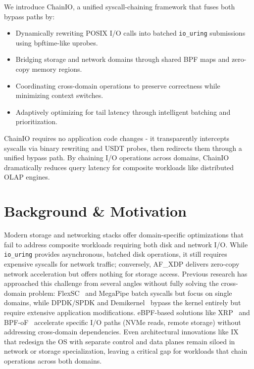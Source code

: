 \documentclass[sigconf,10pt]{acmart}
\newcommand{\sys}{ChainIO\xspace}
\begin{document}
We introduce \sys, a unified syscall-chaining framework that fuses both bypass paths by:
\begin{itemize}[leftmargin=*,itemsep=0pt]
  \item Dynamically rewriting POSIX I/O calls into batched \texttt{io\_uring} submissions using bpftime-like uprobes.
  
  \item Bridging storage and network domains through shared BPF maps and zero-copy memory regions.
  
  \item Coordinating cross-domain operations to preserve correctness while minimizing context switches.
  
  \item Adaptively optimizing for tail latency through intelligent batching and prioritization.
\end{itemize}

\sys requires no application code changes - it transparently intercepts syscalls via binary rewriting and USDT probes, then redirects them through a unified bypass path. By chaining I/O operations across domains, \sys dramatically reduces query latency for composite workloads like distributed OLAP engines.

\section{Background \& Motivation}\label{sec:motivation}

Modern storage and networking stacks offer domain-specific optimizations that fail to address composite workloads requiring both disk and network I/O. While \texttt{io\_uring} provides asynchronous, batched disk operations, it still requires expensive syscalls for network traffic; conversely, AF\_XDP delivers zero-copy network acceleration but offers nothing for storage access. Previous research has approached this challenge from several angles without fully solving the cross-domain problem: FlexSC~\cite{flexsc} and MegaPipe batch syscalls but focus on single domains, while DPDK/SPDK and Demikernel~\cite{zhang2021demikernel} bypass the kernel entirely but require extensive application modifications. eBPF-based solutions like XRP~\cite{Zhong22} and BPF-oF~\cite{zarkadas2023bpf} accelerate specific I/O paths (NVMe reads, remote storage) without addressing cross-domain dependencies. Even architectural innovations like IX~\cite{ix} that redesign the OS with separate control and data planes remain siloed in network or storage specialization, leaving a critical gap for workloads that chain operations across both domains.
\end{document}

